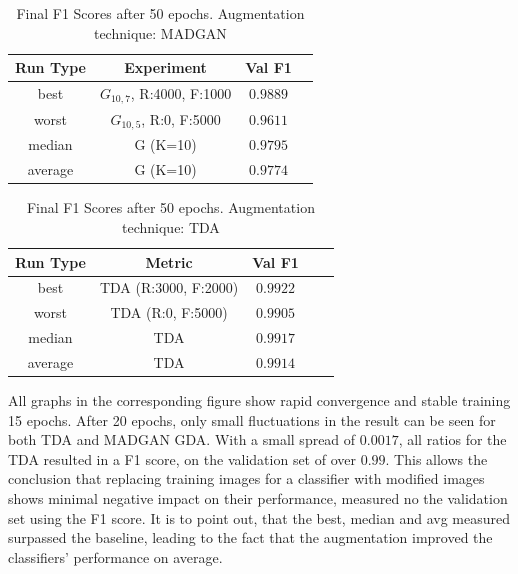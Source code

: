 \begin{table}[H]
	\vspace{-1.5em}
	\centering
	\begin{tabular}{|c|c|c|c|}
		\hline
		Run Type & Experiment & Val F1 \\ \hline
		best & \(G_{10, 7}\), R:4000, F:1000 & $0.9889$\\ \hline
		worst & \(G_{10, 5}\), R:0, F:5000 & $0.9611$\\ \hline
		median & G (K=10) & $0.9795$\\ \hline
		average & G (K=10) & $0.9774$
		\\ \hline
	\end{tabular}
    \caption{Final F1 Scores after 50 epochs. Augmentation technique: MADGAN}
        \label{tab:res_replacement_mnist_tda_vs_madgan__madgan}
\end{table}
\begin{table}[H]
	\centering
	\vspace{-1.5em}
	\begin{tabular}{|c|c|c|c|c|}
		\hline
		Run Type & Metric & Val F1 \\ \hline
		best & TDA (R:3000, F:2000) & $0.9922$\\ \hline
		worst & TDA (R:0, F:5000) & $0.9905$\\ \hline
		median & TDA & $0.9917$\\ \hline
		average & TDA & $0.9914$
		\\ \hline
	\end{tabular}
    \caption{Final F1 Scores after 50 epochs. Augmentation technique: TDA}
        \label{tab:res_replacement_mnist_tda_vs_madgan__tda}
\end{table}

All graphs in the corresponding figure show rapid convergence and stable training 15 epochs. After 20 epochs, only small fluctuations in the result can be seen for both TDA and MADGAN GDA. With a small spread of $0.0017$, all ratios for the TDA resulted in a F1 score, on the validation set of over $0.99$. This allows the conclusion that replacing training images for a classifier with modified images shows minimal negative impact on their performance, measured no the validation set using the F1 score. It is to point out, that the best, median and avg measured surpassed the baseline, leading to the fact that the augmentation improved the classifiers' performance on average.

